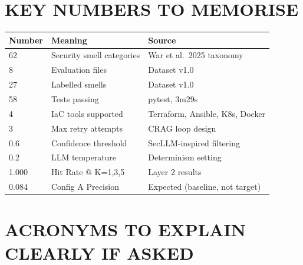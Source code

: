 \documentclass[12pt,a4paper]{article}
\begin{document}
\section*{KEY NUMBERS TO MEMORISE}

\begin{center}
\begin{tabular}{@{}lll@{}}
\toprule
\textbf{Number} & \textbf{Meaning} & \textbf{Source}\\
\midrule
62 & Security smell categories & War et al.\ 2025 taxonomy\\
8 & Evaluation files & Dataset v1.0\\
27 & Labelled smells & Dataset v1.0\\
58 & Tests passing & pytest, 3m29s\\
4 & IaC tools supported & Terraform, Ansible, K8s, Docker\\
3 & Max retry attempts & CRAG loop design\\
0.6 & Confidence threshold & SecLLM-inspired filtering\\
0.2 & LLM temperature & Determinism setting\\
1.000 & Hit Rate @ K=1,3,5 & Layer 2 results\\
0.084 & Config A Precision & Expected (baseline, not target)\\
\bottomrule
\end{tabular}
\end{center}

\section*{ACRONYMS TO EXPLAIN CLEARLY IF ASKED}
\end{document}
